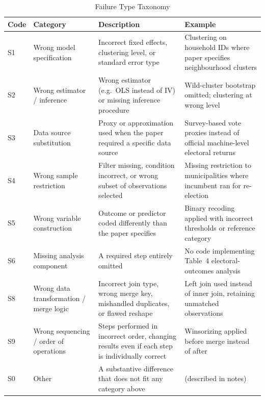 \begin{table}[ht]
\centering
\caption{Failure Type Taxonomy}
\label{tab:failure_types}
\begin{tabular}{llp{6cm}p{4cm}}
\toprule
\textbf{Code} & \textbf{Category} & \textbf{Description} & \textbf{Example} \\
\midrule
S1 & Wrong model specification
   & Incorrect fixed effects, clustering level, or standard error type
   & Clustering on household IDs where paper specifies neighbourhood clusters \\[4pt]
S2 & Wrong estimator / inference
   & Wrong estimator (e.g.\ OLS instead of IV) or missing inference procedure
   & Wild-cluster bootstrap omitted; clustering at wrong level \\[4pt]
S3 & Data source substitution
   & Proxy or approximation used when the paper required a specific data source
   & Survey-based vote proxies instead of official machine-level electoral returns \\[4pt]
S4 & Wrong sample restriction
   & Filter missing, condition incorrect, or wrong subset of observations selected
   & Missing restriction to municipalities where incumbent ran for re-election \\[4pt]
S5 & Wrong variable construction
   & Outcome or predictor coded differently than the paper specifies
   & Binary recoding applied with incorrect thresholds or reference category \\[4pt]
S6 & Missing analysis component
   & A required step entirely omitted
   & No code implementing Table~4 electoral-outcomes analysis \\[4pt]
S8 & Wrong data transformation / merge logic
   & Incorrect join type, wrong merge key, mishandled duplicates, or flawed reshape
   & Left join used instead of inner join, retaining unmatched observations \\[4pt]
S9 & Wrong sequencing / order of operations
   & Steps performed in incorrect order, changing results even if each step is individually correct
   & Winsorizing applied before merge instead of after \\[4pt]
S0 & Other
   & A substantive difference that does not fit any category above
   & (described in notes) \\
\bottomrule
\end{tabular}
\end{table}


